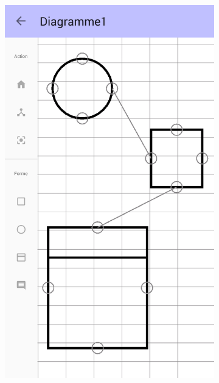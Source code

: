 		\vspace*{\fill}
		\begin{figure}[!h]
			\centering
			\begin{subfigure}[t]{.3\textwidth}
				\includegraphics[width=\textwidth]{img/screen/new/colladia_draw_view_menu_main}
			\end{subfigure}
			~
			\begin{subfigure}[t]{.3\textwidth}

\end{subfigure}
\end{figure}
